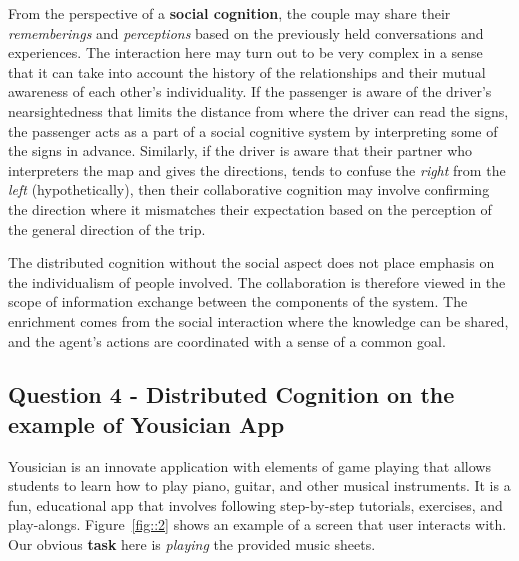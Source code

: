 \documentclass[12pt,letterpaper]{article}
\begin{document}
From the perspective of a \textbf{social cognition}, the couple may share their \textit{rememberings} and \textit{perceptions} based on the previously held conversations and experiences. The interaction here may turn out to be very complex in a sense that it can take into account the history of the relationships and their mutual awareness of each other's individuality. If the passenger is aware of the driver's nearsightedness that limits the distance from where the driver can read the signs, the passenger acts as a part of a social cognitive system by interpreting some of the signs in advance. Similarly, if the driver is aware that their partner who interpreters the map and gives the directions, tends to confuse the \textit{right} from the \textit{left} (hypothetically), then their collaborative cognition may involve confirming the direction where it mismatches their expectation based on the perception of the general direction of the trip. 

The distributed cognition without the social aspect does not place emphasis on the individualism of people involved. The collaboration is therefore viewed in the scope of information exchange between the components of the system. The enrichment comes from the social interaction where the knowledge can be shared, and the agent's actions are coordinated with a sense of a common goal. 


\subsection*{Question 4 - Distributed Cognition on the example of Yousician App}

Yousician is an innovate application with elements of game playing that allows students to learn how to play piano, guitar, and other musical instruments\cite{eli2017yousician}. It is a fun, educational app that involves following step-by-step tutorials, exercises, and play-alongs. Figure~\ref{fig::2} shows an example of a screen that user interacts with. Our obvious \textbf{task} here is \textit{playing} the provided music sheets.
\end{document}
